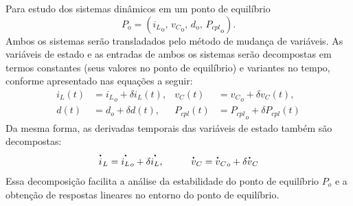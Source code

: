 Para estudo dos sistemas dinâmicos em um ponto de equilíbrio \begin{equation} P_{\text{o}} = \left({i_L}_{\text{o}}, \, {v_C}_{\text{o}}, \, d_{\text{o}}, \, {P_{cpl}}_{\text{o}} \right). \label{eq:operation_point} \end{equation} Ambos os sistemas serão transladados pelo método de mudança de variáveis. As variáveis de estado e as entradas de ambos os sistemas serão decompostas em termos constantes (seus valores no ponto de equilíbrio) e variantes no tempo, conforme apresentado nas equações a seguir: \begin{align}
  {i_L}(t) & = {i_L}_o + \delta i_L(t), & {v_C}(t)     & = {v_C}_o + \delta v_C(t), \label{eq:tranlation_decomposed_states}        \\[12pt]
  {d}(t)   & = d_o + \delta d(t),       & {P_{cpl}}(t) & = {P_{cpl}}_o + \delta P_{cpl}(t) \label{eq:tranlation_decomposed_inputs}
\end{align} Da mesma forma, as derivadas temporais das variáveis de estado também são decompostas: \begin{align}
  \dt{i}_L = {\dt{i_L}}_o + \delta \dt{i_L}, \hspace{1cm}
  \dt{v}_C = {\dt{v}_C}_o + \delta \dt{v}_C
\end{align} Essa decomposição facilita a análise da estabilidade do ponto de equilíbrio $P_o$ e a obtenção de respostas lineares no entorno do ponto de equilíbrio.

